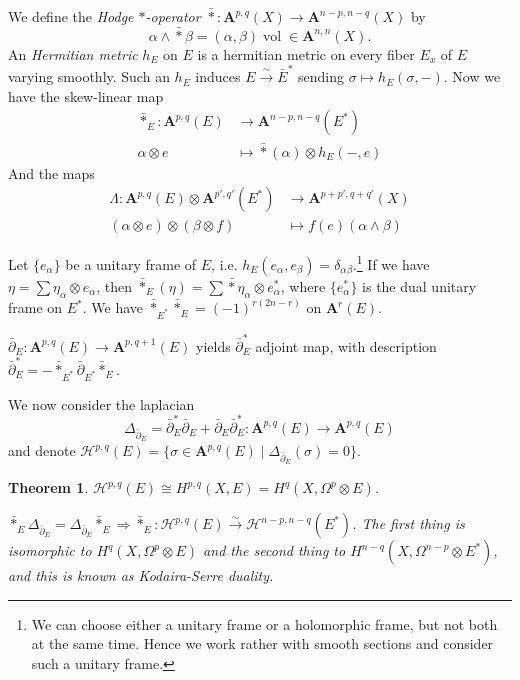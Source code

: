 \documentclass[12pt]{article}
\theoremstyle{darkgreentheorem}
\newtheorem{thm}{Theorem}[section]
\theoremstyle{darkbluedefinition}
\theoremstyle{darkredexample}
\theoremstyle{remark}
\newcommand{\1}{\mathbbm{1}}
\newcommand{\A}{\mathbf{A}}
\renewcommand{\H}{\mathcal{H}}
\DeclareMathOperator{\vol}{vol}
\newcommand{\ot}{\otimes}
\begin{document}
We define the \textit{Hodge $*$-operator} $\bar{*}\colon \A^{p,q}(X)\to \A^{n-p,n-q}(X)$ by
\[ \alpha\wedge \bar{*}\beta = (\alpha,\beta)\vol \in \A^{n,n}(X).\]
An \textit{Hermitian metric} $h_{E}$ on $E$ is a hermitian metric on every fiber $E_{x}$ of $E$ varying smoothly.
Such an $h_{E}$ induces $E\xrightarrow{\sim} \bar{E}^{*}$ sending $\sigma \mapsto h_{E}(\sigma,-)$.
Now we have the skew-linear map
\begin{align*}
    \bar{*}_{E}\colon \A^{p,q}(E) &\to \A^{n-p,n-q}(E^{*}) \\
    \alpha \ot e &\mapsto \bar{*}(\alpha)\ot h_{E}(-,e)
\end{align*}
And the maps
\begin{align*}
    \Lambda \colon \A^{p,q}(E)\ot \A^{p',q'}(E^{*}) & \to \A^{p+p',q+q'}(X) \\
    (\alpha \ot e)\ot (\beta \ot f) & \mapsto f(e)(\alpha\wedge \beta)
\end{align*}

Let $\{ e_{\alpha }\}$ be a unitary frame of $E$, i.e. $h_{E}(e_{\alpha},e_{\beta})=\delta_{\alpha\beta}$.\footnote{We can choose either a unitary frame or a holomorphic frame, but not both at the same time. Hence we work rather with smooth sections and consider such a unitary frame.}
If we have $\eta=\sum \eta_{\alpha}\ot e_{\alpha}$, then $\bar{*}_{E}(\eta)=\sum \bar{*}\eta_{\alpha}\ot e_{\alpha}^{*}$, where $\{ e_{\alpha}^{*}\}$ is the dual unitary frame on $E^{*}$.
We have $\bar{*}_{E^{*}}\bar{*}_{E}=(-1)^{r(2n-r)}$ on $\A^{r}(E)$.

$\bar{\partial }_{E}\colon \A^{p,q}(E)\to \A^{p,q+1}(E)$ yields $\bar{\partial }_{E}^{*}$ adjoint map, with description $\bar{\partial }_{E}^{*}=-\bar{*}_{E^{*}}\bar{\partial }_{E^{*}}\bar{*}_{E}$.

We now consider the laplacian
\[\Delta_{\bar{\partial}_{E}}=\bar{\partial}_{E}^{*}\bar{\partial}_{E} +\bar{\partial }_{E}\bar{\partial}_{E}^{*}\colon \A^{p,q}(E)\to \A^{p,q}(E)\]
and denote $\H^{p,q}(E)=\{\sigma \in \A^{p,q}(E)\mid \Delta_{\bar{\partial }_{E}}(\sigma )=0\}$.

\begin{thm}
    $\H^{p,q}(E)\cong H^{p,q}(X,E)=H^{q}(X,\Omega^{p}\ot E)$.
    
    $\bar{*}_{E}\Delta_{\bar{\partial}_{E}}=\Delta_{\bar{\partial }_{E}}\bar{*}_{E} \Rightarrow \bar{*}_{E}\colon \H^{p,q}(E)\xrightarrow{\sim}\H^{n-p,n-q}(E^{*})$.
    The first thing is isomorphic to $H^{q}(X,\Omega^{p}\ot E)$ and the second thing to $H^{n-q}(X,\Omega^{n-p}\ot E^{*})$, and this is known as \textit{Kodaira-Serre duality}.
\end{thm}
\end{document}
